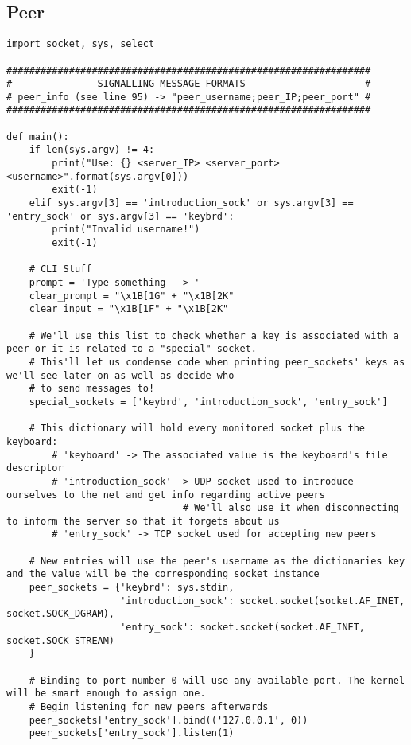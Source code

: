 \documentclass[landscape]{article}
\begin{document}
        \subsection{Peer}
            \begin{verbatim}
import socket, sys, select

################################################################
#               SIGNALLING MESSAGE FORMATS                     #
# peer_info (see line 95) -> "peer_username;peer_IP;peer_port" #
################################################################

def main():
    if len(sys.argv) != 4:
        print("Use: {} <server_IP> <server_port> <username>".format(sys.argv[0]))
        exit(-1)
    elif sys.argv[3] == 'introduction_sock' or sys.argv[3] == 'entry_sock' or sys.argv[3] == 'keybrd':
        print("Invalid username!")
        exit(-1)

    # CLI Stuff
    prompt = 'Type something --> '
    clear_prompt = "\x1B[1G" + "\x1B[2K"
    clear_input = "\x1B[1F" + "\x1B[2K"

    # We'll use this list to check whether a key is associated with a peer or it is related to a "special" socket.
    # This'll let us condense code when printing peer_sockets' keys as we'll see later on as well as decide who
    # to send messages to!
    special_sockets = ['keybrd', 'introduction_sock', 'entry_sock']

    # This dictionary will hold every monitored socket plus the keyboard:
        # 'keyboard' -> The associated value is the keyboard's file descriptor
        # 'introduction_sock' -> UDP socket used to introduce ourselves to the net and get info regarding active peers
                               # We'll also use it when disconnecting to inform the server so that it forgets about us
        # 'entry_sock' -> TCP socket used for accepting new peers

    # New entries will use the peer's username as the dictionaries key and the value will be the corresponding socket instance
    peer_sockets = {'keybrd': sys.stdin,
                    'introduction_sock': socket.socket(socket.AF_INET, socket.SOCK_DGRAM),
                    'entry_sock': socket.socket(socket.AF_INET, socket.SOCK_STREAM)
    }

    # Binding to port number 0 will use any available port. The kernel will be smart enough to assign one.
    # Begin listening for new peers afterwards
    peer_sockets['entry_sock'].bind(('127.0.0.1', 0))
    peer_sockets['entry_sock'].listen(1)


\end{verbatim}
\end{document}
